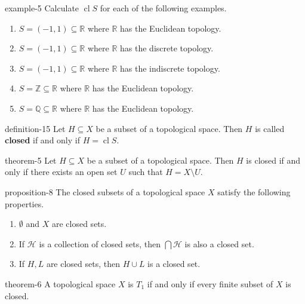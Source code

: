 \documentclass[10pt,]{article}
\newcommand{\terminology}[1]{\textbf{#1}}
\newcommand{\mb}{\mathbb}
\newcommand{\mc}{\mathcal}
\newcommand{\cl}{\operatorname{cl}}
\begin{document}
\begin{example}{}{example-5}%
\hypertarget{p-47}{}%
Calculate \(\cl S\) for each of the following examples.%
\leavevmode%
\begin{enumerate}
\item\hypertarget{li-34}{}\(S=(-1,1)\subseteq\mb R\) where \(\mb R\) has the Euclidean topology.%
\item\hypertarget{li-35}{}\(S=(-1,1)\subseteq\mb R\) where \(\mb R\) has the discrete topology.%
\item\hypertarget{li-36}{}\(S=(-1,1)\subseteq\mb R\) where \(\mb R\) has the indiscrete topology.%
\item\hypertarget{li-37}{}\(S=\mb Z\subseteq\mb R\) where \(\mb R\) has the Euclidean topology.%
\item\hypertarget{li-38}{}\(S=\mb Q\subseteq\mb R\) where \(\mb R\) has the Euclidean topology.%
\end{enumerate}
\end{example}
\begin{definition}{}{definition-15}%
\hypertarget{p-48}{}%
Let \(H\subseteq X\) be a subset of a topological space. Then \(H\) is called \terminology{closed} if and only if \(H=\cl S\).%
\end{definition}
\begin{theorem}{}{}{theorem-5}%
\hypertarget{p-49}{}%
Let \(H\subseteq X\) be a subset of a topological space. Then \(H\) is closed if and only if there exists an open set \(U\) such that \(H=X\setminus U\).%
\end{theorem}
\begin{proposition}{}{}{proposition-8}%
\hypertarget{p-50}{}%
The closed subsets of a topological space \(X\) satisfy the following properties.%
\leavevmode%
\begin{enumerate}
\item\hypertarget{li-39}{}\(\emptyset\) and \(X\) are closed sets.%
\item\hypertarget{li-40}{}If \(\mc H\) is a collection of closed sets, then \(\bigcap\mc H\) is also a closed set.%
\item\hypertarget{li-41}{}If \(H,L\) are closed sets, then \(H\cup L\) is a closed set.%
\end{enumerate}
\end{proposition}
\begin{theorem}{}{}{theorem-6}%
\hypertarget{p-51}{}%
A topological space \(X\) is \(T_1\) if and only if every finite subset of \(X\) is closed.%
\end{theorem}
\end{document}
